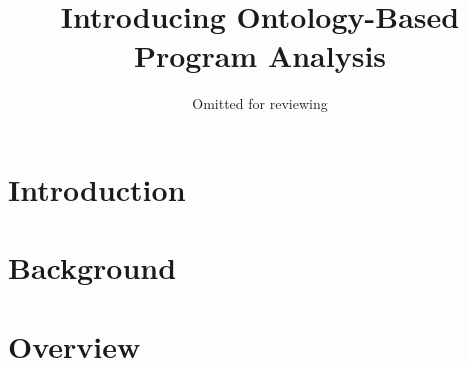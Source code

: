 \documentclass[a4paper,UKenglish]{lipics}
\begin{document}
	
\newcommand {\TODO}[1]{\textcolor{red}{TODO #1}}
\lstset{
	numbers=left,                
	numberstyle=\scriptsize,
	basicstyle=\ttfamily\small, %
	identifierstyle=\ttfamily,
	keywordstyle=\ttfamily,
	frame=single
	}

\title{Introducing Ontology-Based Program Analysis}
\author[1]{Omitted for reviewing}



\maketitle

\begin{abstract}
	
\end{abstract}

\section{Introduction}
\label{sec:intro}


\section{Background}
\label{sec:background}


\section{Overview}
\label{sec:overview}

\end{document}
